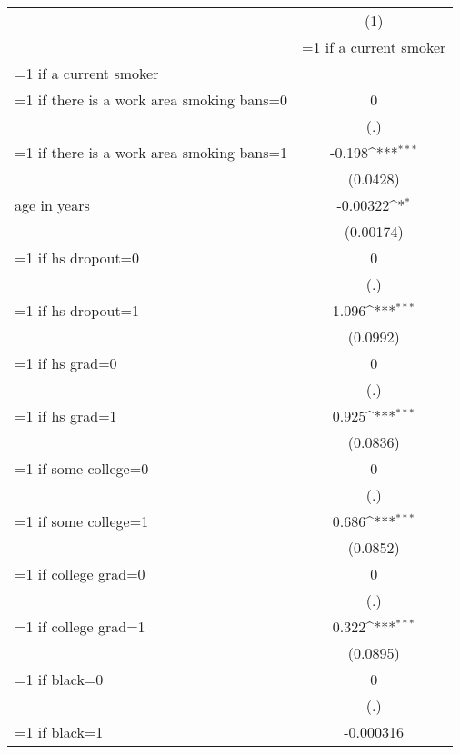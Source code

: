 {
\def\sym#1{\ifmmode^{#1}\else\(^{#1}\)\fi}
\begin{tabular}{l*{1}{c}}
\hline\hline
                    &\multicolumn{1}{c}{(1)}\\
                    &\multicolumn{1}{c}{=1 if a current smoker}\\
\hline
=1 if a current smoker&                     \\
=1 if there is a work area smoking bans=0&           0         \\
                    &         (.)         \\
[1em]
=1 if there is a work area smoking bans=1&      -0.198\sym{***}\\
                    &    (0.0428)         \\
[1em]
age in years        &    -0.00322\sym{*}  \\
                    &   (0.00174)         \\
[1em]
=1 if hs dropout=0  &           0         \\
                    &         (.)         \\
[1em]
=1 if hs dropout=1  &       1.096\sym{***}\\
                    &    (0.0992)         \\
[1em]
=1 if hs grad=0     &           0         \\
                    &         (.)         \\
[1em]
=1 if hs grad=1     &       0.925\sym{***}\\
                    &    (0.0836)         \\
[1em]
=1 if some college=0&           0         \\
                    &         (.)         \\
[1em]
=1 if some college=1&       0.686\sym{***}\\
                    &    (0.0852)         \\
[1em]
=1 if college grad=0&           0         \\
                    &         (.)         \\
[1em]
=1 if college grad=1&       0.322\sym{***}\\
                    &    (0.0895)         \\
[1em]
=1 if black=0       &           0         \\
                    &         (.)         \\
[1em]
=1 if black=1       &   -0.000316         \\

\end{tabular}}
